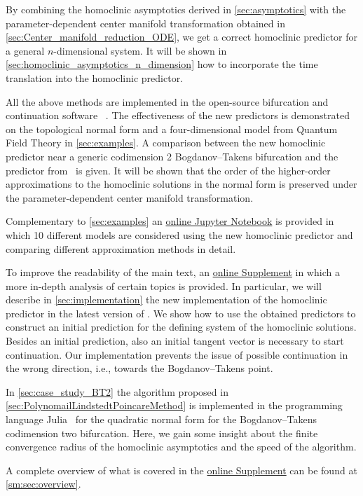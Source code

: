 By combining the homoclinic asymptotics derived in \cref{sec:asymptotics} with
the parameter-de\-pendent center manifold transformation obtained in
\cref{sec:Center_manifold_reduction_ODE}, we get a correct homoclinic
predictor for a general $n$-dimensional system.  It will be shown in
\cref{sec:homoclinic_asymptotics_n_dimension} how to incorporate the time
translation into the homoclinic predictor.
 
All the above methods are implemented in the open-source bifurcation and
continuation software \MATCONT ~\cite{matcont2}. The effectiveness of the new
predictors is demonstrated on the topological normal form and a
four-dimensional model from Quantum Field Theory in \cref{sec:examples}. A
comparison between the new homoclinic predictor near a generic codimension 2
Bogdanov--Takens bifurcation and the predictor from~\cite{Al-Hdaibat2016} is
given. It will be shown that the order of the higher-order approximations to
the homoclinic solutions in the normal form is preserved under the
parameter-dependent center manifold transformation.

Complementary to \cref{sec:examples} an 
\href{https://mmbosschaert.github.io/MatCont7p2NewInitBTHom-/}{online Jupyter Notebook}
is provided in which 10 different models are considered using the new
homoclinic predictor and comparing different approximation methods in detail.

To improve the readability of the main text, an \hyperref[mysupplement]{online
Supplement} in which a more in-depth analysis of certain topics
is provided. In particular, we will describe in \cref{sec:implementation} the
new implementation of the homoclinic predictor in the latest version of
\MATCONT. We show how to use the obtained predictors to construct an initial
prediction for the defining system of the homoclinic solutions. Besides an
initial prediction, also an initial tangent vector is necessary to start
continuation. Our implementation prevents the issue of possible continuation in
the wrong direction, i.e., towards the Bogdanov--Takens point.

In \cref{sec:case_study_BT2} the algorithm proposed in
\cref{sec:PolynomailLindstedtPoincareMethod} is implemented in the programming
language Julia~\cite{bezanson2017julia} for the quadratic normal form for the
Bogdanov--Takens codimension two bifurcation. Here, we gain some insight about
the finite convergence radius of the homoclinic asymptotics and the speed of
the algorithm.

A complete overview of what is covered in the \hyperref[mysupplement]{online
Supplement} can be found at \cref{sm:sec:overview}.


